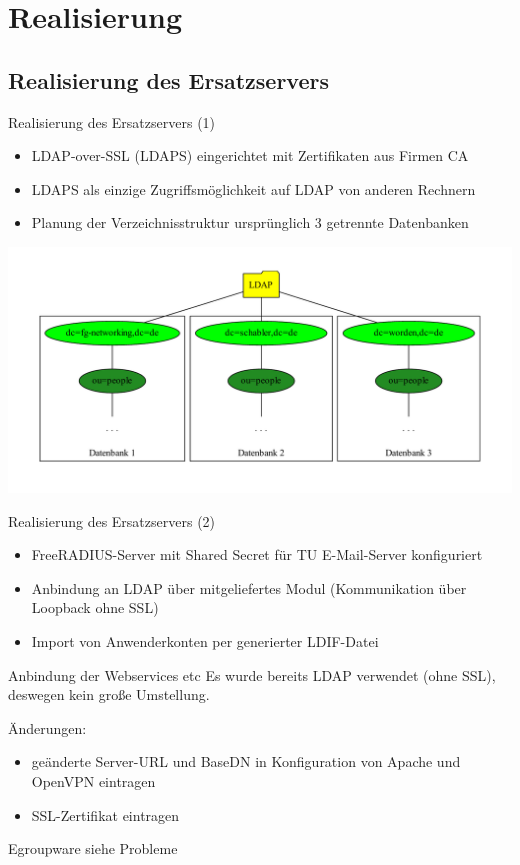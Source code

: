 \documentclass[handout,svgnames]{beamer}
\begin{document}
\section{Realisierung}
\subsection{Realisierung des Ersatzservers}
\begin{frame}{Realisierung des Ersatzservers (1)}
\begin{itemize}
	\item LDAP-over-SSL (LDAPS) eingerichtet mit Zertifikaten aus Firmen CA
	\item LDAPS als einzige Zugriffsmöglichkeit auf LDAP von anderen Rechnern
	\item Planung der Verzeichnisstruktur ursprünglich 3 getrennte Datenbanken
\end{itemize}
\includegraphics[width=\textwidth]{Bilder/LDAP-fgn-planned.pdf}
\end{frame}


\begin{frame}{Realisierung des Ersatzservers (2)}
\begin{itemize}
	\item FreeRADIUS-Server mit Shared Secret für TU E-Mail-Server konfiguriert
	\item Anbindung an LDAP über mitgeliefertes Modul (Kommunikation über Loopback ohne SSL)
	\item Import von Anwenderkonten per generierter LDIF-Datei
\end{itemize}
\end{frame}


\begin{frame}{Anbindung der Webservices etc}
Es wurde bereits LDAP verwendet (ohne SSL), deswegen kein große Umstellung.

Änderungen:
\begin{itemize}
	\item geänderte Server-URL und BaseDN in Konfiguration von Apache und OpenVPN eintragen
	\item SSL-Zertifikat eintragen
\end{itemize}
Egroupware siehe Probleme
\end{frame}
\end{document}
